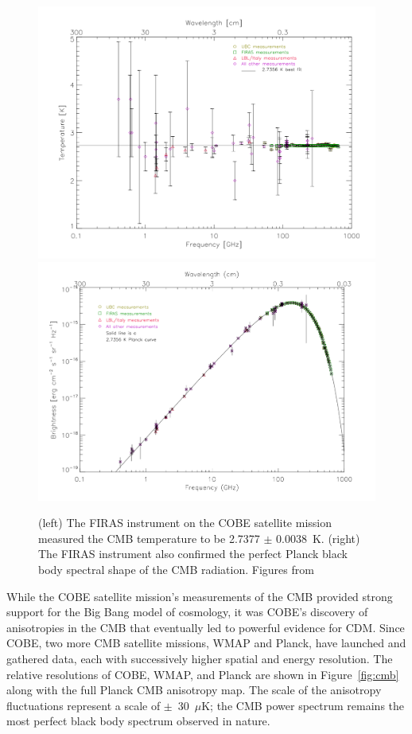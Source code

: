 \begin{figure}[htbp]
\begin{center}
\includegraphics[width=\halffig]{figures/theory/cobe_temp.png}
\includegraphics[width=\halffig]{figures/theory/cobe_spectrum.png}
\caption{(left) The FIRAS instrument on the COBE satellite mission measured the \ac{CMB} temperature to be 2.7377 $\pm$ 0.0038~K. (right) The FIRAS instrument also confirmed the perfect Planck black body spectral shape of the \ac{CMB} radiation. Figures from \cite{Smoot1999} }
\label{fig:cobe}
\end{center}
\end{figure}

While the COBE satellite mission's measurements of the \ac{CMB} provided strong support for the Big Bang model of cosmology, it was COBE's discovery of anisotropies in the \ac{CMB} that eventually led to powerful evidence for \ac{CDM}. Since COBE, two more \ac{CMB} satellite missions, WMAP and Planck, have launched and gathered data, each with successively higher spatial and energy resolution. The relative resolutions of COBE, WMAP, and Planck are shown in Figure~\ref{fig:cmb} along with the full Planck \ac{CMB} anisotropy map. The scale of the anisotropy fluctuations represent a scale of  $\pm$~30~$\mu$K; the \ac{CMB} power spectrum remains the most perfect black body spectrum observed in nature. 


